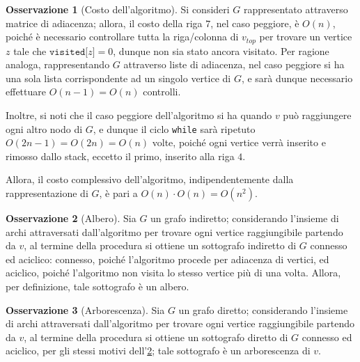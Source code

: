 \documentclass[14pt]{extreport}
\theoremstyle{definition}
\theoremstyle{definition}
\newtheorem{remark}{Osservazione}[subsection]
\begin{document}
\begin{remark}[Costo dell'algoritmo]
    Si consideri $G$ rappresentato attraverso matrice di adiacenza; allora, il costo della riga $7$, nel caso peggiore, è $O(n)$, poiché è necessario controllare tutta la riga/colonna di $v_{top}$ per trovare un vertice $z$ tale che $\texttt{visited[}z\texttt{]} = 0$, dunque non sia stato ancora visitato. Per ragione analoga, rappresentando $G$ attraverso liste di adiacenza, nel caso peggiore si ha una sola lista corrispondente ad un singolo vertice di $G$, e sarà dunque necessario effettuare $O(n - 1) = O(n)$ controlli.

    Inoltre, si noti che il caso peggiore dell'algoritmo si ha quando $v$ può raggiungere ogni altro nodo di $G$, e dunque il ciclo \texttt{while} sarà ripetuto $O(2n - 1) = O(2n) = O(n)$ volte, poiché ogni vertice verrà inserito e rimosso dallo stack, eccetto il primo, inserito alla riga $4$.

    Allora, il costo complessivo dell'algoritmo, indipendentemente dalla rappresentazione di $G$, è pari a $O(n) \cdot O(n) = O(n^2)$.
\end{remark}

\begin{remark}[Albero]
    \label{Sottografo di un grafo indiretto}
    Sia $G$ un grafo indiretto; considerando l'insieme di archi attraversati dall'algoritmo per trovare ogni vertice raggiungibile partendo da $v$, al termine della procedura si ottiene un sottografo indiretto di $G$ connesso ed aciclico: connesso, poiché l'algoritmo procede per adiacenza di vertici, ed aciclico, poiché l'algoritmo non visita lo stesso vertice più di una volta. Allora, per definizione, tale sottografo è un albero.
\end{remark}

\begin{remark}[Arborescenza]
    Sia $G$ un grafo diretto; considerando l'insieme di archi attraversati dall'algoritmo per trovare ogni vertice raggiungibile partendo da $v$, al termine della procedura si ottiene un sottografo diretto di $G$ connesso ed aciclico, per gli stessi motivi dell'\cref{Sottografo di un grafo indiretto}; tale sottografo è un arborescenza di $v$.
\end{remark}
\end{document}
